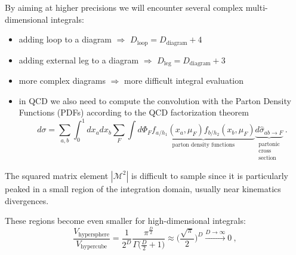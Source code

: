 \documentclass[t,handout,professionalfont,serif]{beamer}
\begin{document}
\begin{frame}{}
	\scriptsize
	By aiming at higher precisions we will encounter several complex multi-dimensional integrals:
	\begin{itemize}
		\item adding loop to a diagram $\Rightarrow$ $D_\text{loop} = D_\text{diagram} + 4$
		\item adding external leg to a diagram $\Rightarrow$ $D_\text{leg} = D_\text{diagram} + 3$
		\item more complex diagrams $\Rightarrow$ more difficult integral evaluation
		\item in QCD we also need to compute the convolution with the Parton Density Functions (PDFs) according to the QCD factorization theorem
		\begin{equation}
			\label{QCD fact}
			d\sigma = \sum_{a,b}\int_0^1 dx_a dx_b \sum_F \int d\Phi_F \underbrace{f_{a/h_1}(x_a,\mu_F) f_{b/h_2}(x_b,\mu_F) }_\text{parton density functions} \underbrace{d\hat{\sigma}_{ab \rightarrow F}}_{\substack{\text{partonic}\\ \text{cross} \\ \text{section}}} \ .
		\end{equation}
	\end{itemize}
	The squared matrix element $|\mathcal{M}^2|$ is difficult to sample since it is particularly peaked in a small region of the integration domain, usually near kinematics divergences. 
	
	These regions become even smaller for high-dimensional integrals:
	\begin{equation}
		\frac{V_{\text{hypersphere}}}{V_{\text{hypercube} }} = \frac{1}{2^D} \frac{\pi^{\frac{D}{2}}}{\Gamma\big(\frac{D}{2} + 1\big)} \approx  \bigg( \frac{\sqrt{\pi}}{2} \bigg)^D \xrightarrow{D \rightarrow  \infty} 0 \ ,
	\end{equation}
	
\end{frame}
\end{document}
